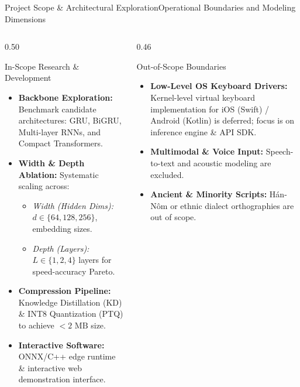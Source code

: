 \documentclass[aspectratio=169,10pt]{beamer}
\begin{document}
\begin{frame}{Project Scope \& Architectural Exploration}{Operational Boundaries and Modeling Dimensions}
  \begin{columns}[T]
    \begin{column}{0.50\textwidth}
      \begin{exampleblock}{In-Scope Research \& Development}
        \begin{itemize}\setlength{\itemsep}{2pt}\scriptsize
          \item \textbf{Backbone Exploration:} Benchmark candidate architectures: GRU, BiGRU, Multi-layer RNNs, and Compact Transformers.
          \item \textbf{Width \& Depth Ablation:} Systematic scaling across:
            \begin{itemize}\setlength{\itemsep}{1pt}\scriptsize
              \item \textit{Width (Hidden Dims):} $d \in \{64, 128, 256\}$, embedding sizes.
              \item \textit{Depth (Layers):} $L \in \{1, 2, 4\}$ layers for speed-accuracy Pareto.
            \end{itemize}
          \item \textbf{Compression Pipeline:} Knowledge Distillation (KD) \& INT8 Quantization (PTQ) to achieve $<2\text{ MB}$ size.
          \item \textbf{Interactive Software:} ONNX/C++ edge runtime \& interactive web demonstration interface.
        \end{itemize}
      \end{exampleblock}
    \end{column}

    \begin{column}{0.46\textwidth}
      \begin{alertblock}{Out-of-Scope Boundaries}
        \begin{itemize}\setlength{\itemsep}{3pt}\scriptsize
          \item \textbf{Low-Level OS Keyboard Drivers:} Kernel-level virtual keyboard implementation for iOS (Swift) / Android (Kotlin) is deferred; focus is on inference engine \& API SDK.
          \item \textbf{Multimodal \& Voice Input:} Speech-to-text and acoustic modeling are excluded.
          \item \textbf{Ancient \& Minority Scripts:} H\'an-N\^om or ethnic dialect orthographies are out of scope.
        \end{itemize}
      \end{alertblock}
    \end{column}
  \end{columns}
\end{frame}
\end{document}
